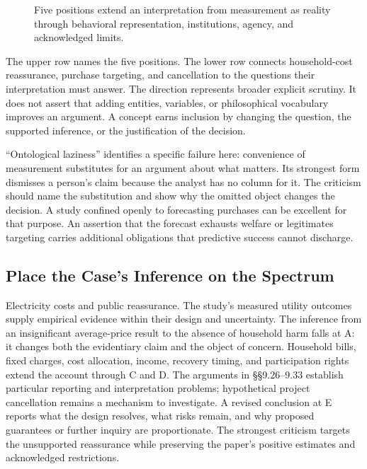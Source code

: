 \begin{figure}[htbp]
\centering

\caption{Five positions extend an interpretation from measurement as reality through behavioral representation, institutions, agency, and acknowledged limits.}\label{fig:M09_ontological_spectrum}
\end{figure}

The upper row names the five positions. The lower row connects
household-cost reassurance, purchase targeting, and cancellation to the
questions their interpretation must answer. The direction represents
broader explicit scrutiny. It does not assert that adding entities,
variables, or philosophical vocabulary improves an argument. A concept
earns inclusion by changing the question, the supported inference, or
the justification of the decision.

``Ontological laziness'' identifies a specific failure here: convenience
of measurement substitutes for an argument about what matters. Its
strongest form dismisses a person's claim because the analyst has no
column for it. The criticism should name the substitution and show why
the omitted object changes the decision. A study confined openly to
forecasting purchases can be excellent for that purpose. An assertion
that the forecast exhausts welfare or legitimates targeting carries
additional obligations that predictive success cannot discharge.

\hypertarget{M09-place-the-cases-inference-on-the-spectrum}{%
\subsection{Place the Case's Inference on the
Spectrum}\label{M09-place-the-cases-inference-on-the-spectrum}}

\noindent \noindent Electricity costs and public reassurance. The study's measured
utility outcomes supply empirical evidence within their design and
uncertainty. The inference from an insignificant average-price result to
the absence of household harm falls at A: it changes both the
evidentiary claim and the object of concern. Household bills, fixed
charges, cost allocation, income, recovery timing, and participation
rights extend the account through C and D. The arguments in §§9.26--9.33
establish particular reporting and interpretation problems; hypothetical
project cancellation remains a mechanism to investigate. A revised
conclusion at E reports what the design resolves, what risks remain, and
why proposed guarantees or further inquiry are proportionate. The
strongest criticism targets the unsupported reassurance while preserving
the paper's positive estimates and acknowledged restrictions.

